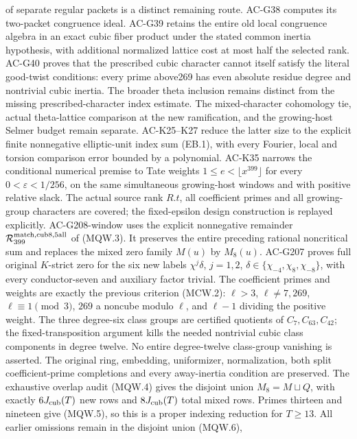 \documentclass[11pt,a4paper]{article}
\theoremstyle{definition}
\theoremstyle{remark}
\begin{document}
of separate regular packets is a distinct remaining route.
AC-G38 computes its two-packet congruence ideal. AC-G39 retains
the entire old local congruence algebra in an exact cubic
fiber product under the stated common inertia hypothesis,
with additional normalized lattice cost at most half the selected rank.
AC-G40 proves that the prescribed cubic character cannot itself
satisfy the literal good-twist conditions: every prime above269
has even absolute residue degree and nontrivial cubic inertia.
The broader theta inclusion remains distinct from the missing
prescribed-character index estimate.
The mixed-character
cohomology tie, actual theta-lattice comparison at the new ramification,
and the growing-host Selmer budget remain separate.
AC-K25--K27 reduce the latter size to the explicit finite
nonnegative elliptic-unit index sum (EB.1), with every Fourier,
local and torsion comparison error bounded by a polynomial.
AC-K35 narrows the conditional numerical premise to Tate weights
$1\leq e<\lfloor x^{399}\rfloor$ for every
$0<\varepsilon<1/256$, on the same simultaneous growing-host
windows and with positive relative slack. The actual source rank
$R.t$, all coefficient primes and all growing-group characters are
covered; the fixed-epsilon design construction is replayed explicitly.
AC-G208-window uses the explicit nonnegative remainder
$\mathcal R_{399}^{\rm match,cub8,5all}$ of (MQW.3).
It preserves the entire preceding rational noncritical sum
and replaces the mixed zero family $M(u)$ by $M_8(u)$.
AC-G207 proves full original $K$-strict zero for the six new
labels $\chi^j\delta$, $j=1,2$,
$\delta\in\{\chi_{-4},\chi_8,\chi_{-8}\}$,
with every conductor-seven and auxiliary factor trivial.
The coefficient primes and weights are exactly the previous
criterion (MCW.2): $\ell>3$, $\ell\ne7,269$,
$\ell\equiv1\pmod3$, $269$ a noncube modulo $\ell$,
and $\ell-1$ dividing the positive weight.
The three degree-six class groups are certified quotients
of $C_7,C_{63},C_{42}$; the fixed-transposition argument kills
the needed nontrivial cubic class components in degree twelve.
No entire degree-twelve class-group vanishing is asserted.
The original ring, embedding, uniformizer, normalization,
both split coefficient-prime completions and every away-inertia
condition are preserved.
The exhaustive overlap audit (MQW.4) gives the disjoint union
$M_8=M\sqcup Q$, with exactly $6J_{\rm cub}(T)$ new rows and
$8J_{\rm cub}(T)$ total mixed rows. Primes thirteen and nineteen
give (MQW.5), so this is a proper indexing reduction for $T\geq13$.
All earlier omissions remain in the disjoint union (MQW.6),
\end{document}
